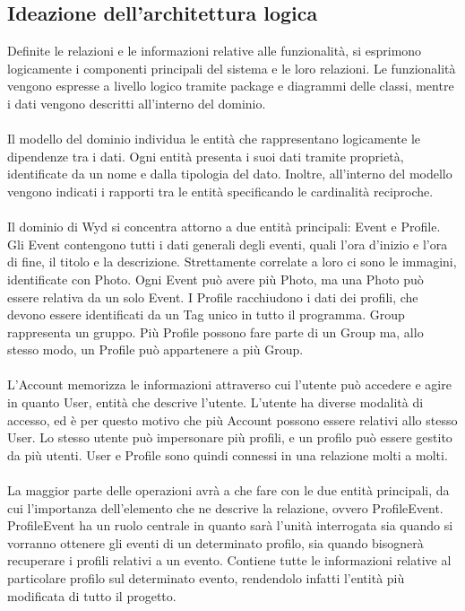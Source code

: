 \clearpage




\subsection{Ideazione dell'architettura logica}
Definite le relazioni e le informazioni relative alle funzionalità,
si esprimono logicamente i componenti principali del sistema e le loro relazioni.
Le funzionalità vengono espresse a livello logico tramite package e diagrammi delle classi,
mentre i dati vengono descritti all'interno del dominio. \\
\\
Il modello del dominio individua le entità che rappresentano logicamente le dipendenze tra i dati.
Ogni entità presenta i suoi dati tramite proprietà,
identificate da un nome e dalla tipologia del dato.
Inoltre, all'interno del modello vengono indicati i rapporti tra le entità specificando le cardinalità reciproche.\\
\\
Il dominio di Wyd si concentra attorno a due entità principali: Event e Profile.\\
Gli Event contengono tutti i dati generali degli eventi,
quali l'ora d'inizio e l'ora di fine, il titolo e la descrizione.
Strettamente correlate a loro ci sono le immagini, identificate con Photo.
Ogni Event può avere più Photo, ma una Photo può essere relativa da un solo Event.
I Profile racchiudono i dati dei profili, 
che devono essere identificati da un Tag unico in tutto il programma.
Group rappresenta un gruppo.
Più Profile possono fare parte di un Group ma, 
allo stesso modo, un Profile può appartenere a più Group.\\
\\
L'Account memorizza le informazioni attraverso cui l'utente può accedere e
agire in quanto User, entità che descrive l'utente.
L'utente ha diverse modalità di accesso,
ed è per questo motivo che più Account possono essere relativi allo stesso User.
Lo stesso utente può impersonare più profili,
e un profilo può essere gestito da più utenti.
User e Profile sono quindi connessi in una relazione molti a molti.\\
\\
La maggior parte delle operazioni avrà a che fare con le due entità principali,
da cui l'importanza dell'elemento che ne descrive la relazione, ovvero ProfileEvent.\\
ProfileEvent ha un ruolo centrale in quanto sarà l'unità interrogata
sia quando si vorranno ottenere gli eventi di un determinato profilo,
sia quando bisognerà recuperare i profili relativi a un evento.
Contiene tutte le informazioni relative al particolare profilo sul determinato evento,
rendendolo infatti l'entità più modificata di tutto il progetto.\\
\\

